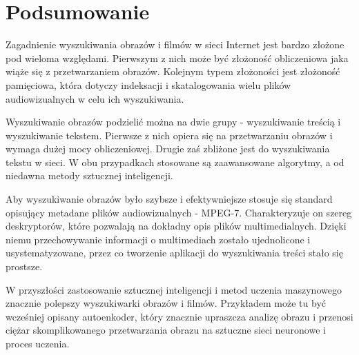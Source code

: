 \chapter{Podsumowanie}
Zagadnienie wyszukiwania obrazów i filmów w sieci Internet jest bardzo złożone pod wieloma względami. Pierwszym z nich może być złożoność obliczeniowa jaka wiąże się z przetwarzaniem obrazów. Kolejnym typem złożoności jest złożoność pamięciowa, która dotyczy indeksacji i skatalogowania wielu plików audiowizualnych w celu ich wyszukiwania. 

Wyszukiwanie obrazów podzielić można na dwie grupy - wyszukiwanie treścią i wyszukiwanie tekstem. Pierwsze z nich opiera się na przetwarzaniu obrazów i wymaga dużej mocy obliczeniowej. Drugie zaś zbliżone jest do wyszukiwania tekstu  w sieci. W obu przypadkach stosowane są zaawansowane algorytmy, a od niedawna metody sztucznej inteligencji.

Aby wyszukiwanie obrazów było szybsze i efektywniejsze stosuje się standard opisujący metadane plików audiowizualnych - MPEG-7. Charakteryzuje on szereg deskryptorów, które pozwalają na dokładny opis plików multimedialnych. Dzięki niemu przechowywanie informacji o multimediach zostało ujednolicone i usystematyzowane, przez co tworzenie aplikacji do wyszukiwania treści stało się prostsze.

W przyszłości zastosowanie sztucznej inteligencji i metod uczenia maszynowego znacznie polepszy wyszukiwarki obrazów i filmów. Przykładem może tu być wcześniej opisany autoenkoder, który znacznie upraszcza analizę obrazu i przenosi ciężar  skomplikowanego przetwarzania obrazu na sztuczne sieci neuronowe i proces uczenia.
